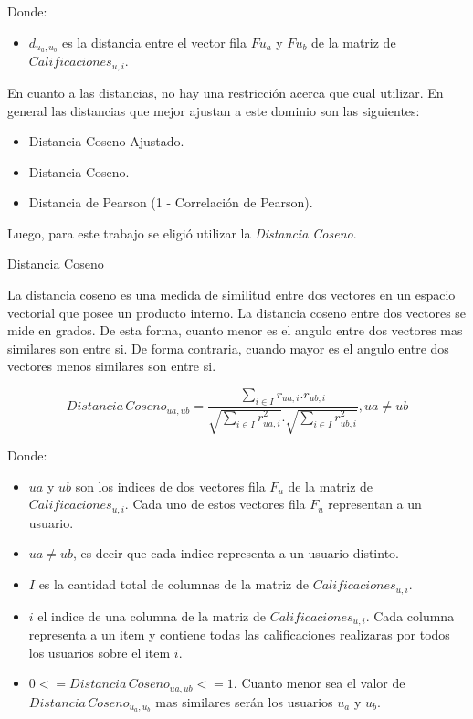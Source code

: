 \documentclass[11pt,a4paper,twoside]{thesis}
\begin{document}
\begin{description}
	\item[Donde:]
\end{description}
\begin{itemize}
	\item $d_{u_a,u_b}$ es la distancia entre el vector fila $F{u_a}$ y $F{u_b}$ de la matriz de $Calificaciones_{u,i}$.
\end{itemize}


En cuanto a las distancias, no hay una restricción acerca que cual utilizar. En general las distancias que mejor ajustan a este dominio son las siguientes:

\begin{itemize}
	\item Distancia Coseno Ajustado.
	\item Distancia Coseno.
	\item Distancia de Pearson (1 - Correlación de Pearson).
\end{itemize}

Luego, para este trabajo se eligió utilizar la \textit{Distancia Coseno}.

\begin{description}
	\item[Distancia Coseno]
\end{description}

La distancia coseno es una medida de similitud entre dos vectores en un espacio vectorial que posee un producto interno. La distancia coseno entre dos vectores se mide en grados. 
De esta forma, cuanto menor es el angulo entre dos vectores mas similares son entre si. De forma contraria, cuando mayor es el angulo entre dos vectores menos similares son entre si.

\begin{equation}
	Distancia \mspace{3mu}Coseno_{ua, ub} = \frac{ \sum_{i \in I} r_{ua, i}.r_{ub, i}}{\sqrt{\sum_{i \in I} r_{ua, i}^2}.\sqrt{\sum_{i \in I} r_{ub, i}^2}  }, ua \neq ub
\end{equation}

\begin{description}
	\item[Donde:]
\end{description}
\begin{itemize}
	\item $ua$ y $ub$ son los indices de dos vectores fila $F_u$ de la matriz de $Calificaciones_{u,i}$. Cada uno de estos vectores fila $F_u$ representan a un usuario.
 	\item $ua \neq ub$, es decir que cada indice representa a un usuario distinto.
	\item $I$ es la cantidad total de columnas de la matriz de $Calificaciones_{u,i}$.
	\item $i$ el indice de una columna de la matriz de $Calificaciones_{u,i}$. Cada columna representa a un item y contiene todas las calificaciones realizaras por todos los usuarios sobre el item $i$.
	\item $0 <= Distancia \mspace{3mu} Coseno_{ua, ub} <= 1$. Cuanto menor sea el valor de $Distancia \mspace{3mu} Coseno_{u_a, u_b}$ mas similares serán los usuarios $u_a$ y $u_b$.
\end{itemize}
\end{document}
